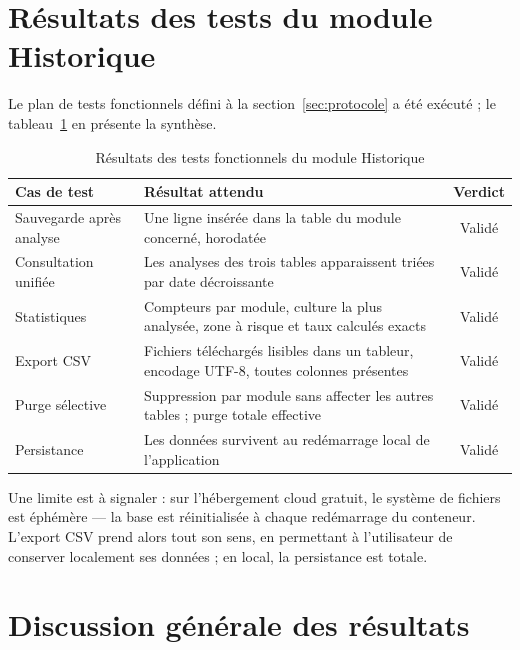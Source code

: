 \section{Résultats des tests du module Historique}
\label{sec:res_historique}

Le plan de tests fonctionnels défini à la
section~\ref{sec:protocole} a été exécuté ; le
tableau~\ref{tab:tests_hist} en présente la synthèse.

\begin{table}[H]
	\centering
	\caption{Résultats des tests fonctionnels du module Historique}
	\label{tab:tests_hist}
	\small
	\begin{tabularx}{\textwidth}{lXc}
		\toprule
		\textbf{Cas de test} & \textbf{Résultat attendu} &
		\textbf{Verdict} \\
		\midrule
		Sauvegarde après analyse & Une ligne insérée dans la table du
		module concerné, horodatée & Validé \\
		Consultation unifiée & Les analyses des trois tables
		apparaissent triées par date décroissante & Validé \\
		Statistiques & Compteurs par module, culture la plus analysée,
		zone à risque et taux calculés exacts & Validé \\
		Export CSV & Fichiers téléchargés lisibles dans un tableur,
		encodage UTF-8, toutes colonnes présentes & Validé \\
		Purge sélective & Suppression par module sans affecter les
		autres tables ; purge totale effective & Validé \\
		Persistance & Les données survivent au redémarrage local de
		l'application & Validé \\
		\bottomrule
	\end{tabularx}
\end{table}

Une limite est à signaler : sur l'hébergement cloud gratuit, le
système de fichiers est éphémère --- la base est réinitialisée à
chaque redémarrage du conteneur. L'export CSV prend alors tout
son sens, en permettant à l'utilisateur de conserver localement
ses données ; en local, la persistance est totale.

\section{Discussion générale des résultats}
\label{sec:discussion}

